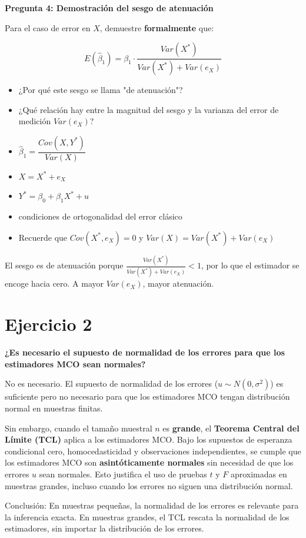 \documentclass[12pt]{article}
\begin{document}
{\bf Pregunta 4: Demostración del sesgo de atenuación}

Para el caso de error en $X$, demuestre \textbf{formalmente} que:

\[
E(\hat{\beta}_1) = \beta_1 \cdot \frac{Var(X^{*})}{Var(X^{*}) + Var(e_X)}
\]


\begin{itemize}
    \item ¿Por qué este sesgo se llama "de atenuación"?
    \item ¿Qué relación hay entre la magnitud del sesgo y la varianza del error de medición $Var(e_X)$?
\end{itemize}
{\color{blue}





\begin{itemize}
    \item  $\hat{\beta}_1 = \dfrac{Cov(X, Y^{*})}{Var(X)}$
    \item  $X = X^{*} + e_X$
    \item  $Y^{*} = \beta_0 + \beta_1 X^{*} + u$
    \item condiciones de ortogonalidad del error clásico
    \item Recuerde que $Cov(X^{*}, e_X) = 0$ y $Var(X) = Var(X^{*}) + Var(e_X)$
\end{itemize}
 El sesgo es de atenuación porque $\frac{Var(X^{*})}{Var(X^{*})+Var(e_X)} < 1$, por lo que el estimador se encoge hacia cero. A mayor $Var(e_X)$, mayor atenuación.}


\section{Ejercicio 2} 

\textbf{¿Es necesario el supuesto de normalidad de los errores para que los estimadores MCO sean normales?}

{\color{blue}
No es necesario. El supuesto de normalidad de los errores ($u \sim N(0, \sigma^2)$) es suficiente pero no necesario para que los estimadores MCO tengan distribución normal en muestras finitas.

Sin embargo, cuando el tamaño muestral $n$ es \textbf{grande}, el \textbf{Teorema Central del Límite (TCL)} aplica a los estimadores MCO. Bajo los supuestos de esperanza condicional cero, homocedasticidad y observaciones independientes, se cumple que
los estimadores MCO son \textbf{asintóticamente normales} sin necesidad de que los errores $u$ sean normales. Esto justifica el uso de pruebas $t$ y $F$ aproximadas en muestras grandes, incluso cuando los errores no siguen una distribución normal.

\bigskip
Conclusión: En muestras pequeñas, la normalidad de los errores es relevante para la inferencia exacta. En muestras grandes, el TCL rescata la normalidad de los estimadores, sin importar la distribución de los errores.}
\end{document}
